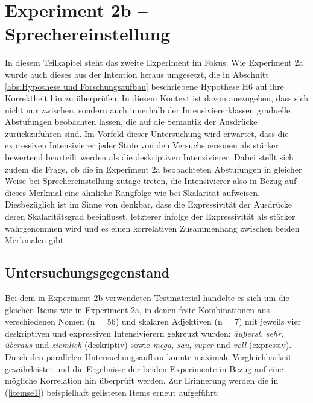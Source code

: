 




\section{Experiment 2b -- Sprechereinstellung}\label{abs:Sprechereinstellung}
In diesem Teilkapitel steht das zweite Experiment im Fokus. Wie {Experiment 2a} wurde auch dieses aus der Intention heraus umgesetzt, die in Abschnitt \ref{abs:Hypothese und Forschungsaufbau} beschriebene Hypothese H6 auf ihre Korrektheit hin zu überprüfen. In diesem Kontext ist davon auszugehen, dass sich nicht nur zwischen, sondern auch innerhalb der Intensiviererklassen graduelle Abstufungen beobachten lassen, die auf die Semantik der Ausdrücke zurückzuführen sind. Im Vorfeld dieser Untersuchung wird erwartet, dass die expressiven Intensivierer jeder Stufe von den Versuchspersonen als stärker bewertend beurteilt werden als die deskriptiven Intensivierer. Dabei stellt sich zudem die Frage, ob die in Experiment 2a beobachteten Abstufungen in gleicher Weise bei Sprechereinstellung zutage treten, die Intensivierer also in Bezug auf dieses Merkmal eine ähnliche Rangfolge wie bei Skalarität aufweisen. Diesbezüglich ist im Sinne von \citet[133]{Gutzmann.2019a} denkbar, dass die Expressivität der Ausdrücke deren Skalaritätsgrad beeinflusst, letzterer infolge der Expressivität als stärker wahrgenommen wird und es einen korrelativen Zusammenhang zwischen beiden Merkmalen gibt.





\subsection{Untersuchungsgegenstand}\label{abs:Untersuchungsgegenstand2509}
Bei dem in Experiment 2b verwendeten Testmaterial handelte es sich um die gleichen Items wie in Experiment 2a, in denen feste Kombinationen aus verschiedenen Nomen (n = 56) und skalaren Adjektiven (n = 7) mit jeweils vier deskriptiven und expressiven Intensivierern gekreuzt wurden: \textit{äußerst}, \textit{sehr}, \textit{überaus} und \textit{ziemlich} (deskriptiv) sowie \textit{mega}, \textit{sau}, \textit{super} und \textit{voll} (expressiv). Durch den parallelen Untersuchungsaufbau konnte maximale Vergleichbarkeit gewährleistet und die Ergebnisse der beiden Experimente in Bezug auf eine mögliche Korrelation hin überprüft werden. Zur Erinnerung werden die in (\ref{itemse1}) beispielhaft gelisteten Items erneut aufgeführt:

